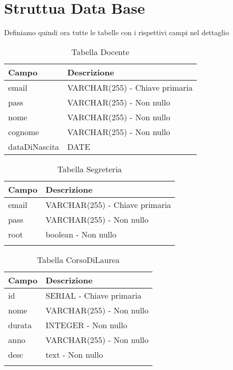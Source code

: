 \section{Struttua Data Base}

Definiamo quindi ora tutte le tabelle con i rispettivi campi nel dettaglio 
\begin{table}[ht]
\centering
\caption{Tabella Docente}
\begin{tabularx}{\textwidth}{lX}
\toprule
\textbf{Campo} & \textbf{Descrizione} \\
\midrule
email & VARCHAR(255) - Chiave primaria \\
pass & VARCHAR(255) - Non nullo \\
nome & VARCHAR(255) - Non nullo \\
cognome & VARCHAR(255) - Non nullo \\
dataDiNascita & DATE \\
\bottomrule
\end{tabularx}
\label{tab:docente}
\end{table}

\begin{table}[ht]
\centering
\caption{Tabella Segreteria}
\begin{tabularx}{\textwidth}{lX}
\toprule
\textbf{Campo} & \textbf{Descrizione} \\
\midrule
email & VARCHAR(255) - Chiave primaria \\
pass & VARCHAR(255) - Non nullo \\
root & boolean - Non nullo \\

\bottomrule
\label{tab:segreteria}

\end{tabularx}
\end{table}


\begin{table}[ht]
\centering
\caption{Tabella CorsoDiLaurea}
\begin{tabularx}{\textwidth}{lX}
\toprule
\textbf{Campo} & \textbf{Descrizione} \\
\midrule
id & SERIAL - Chiave primaria \\
nome & VARCHAR(255) - Non nullo \\
durata & INTEGER - Non nullo \\
anno & VARCHAR(255) - Non nullo \\
desc & text - Non nullo \\

\bottomrule
\label{tab:corsoDiLaurea}

\end{tabularx}
\end{table}


